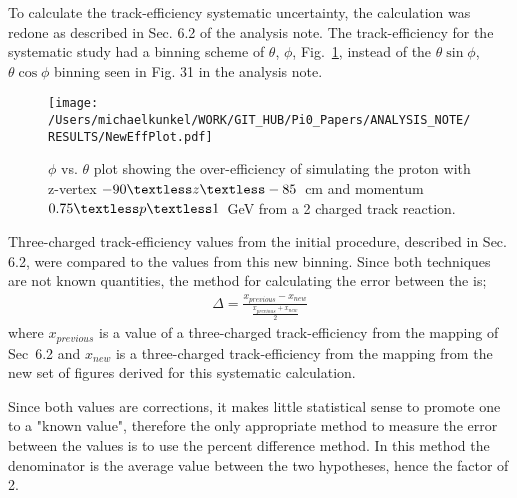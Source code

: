 \documentclass[10pt,a4paper]{report}
\author{Michael C. Kunkel}
\newlength{\figwidth}
\newlength{\hfigheight}
\begin{document}
	To calculate the track-efficiency systematic uncertainty, the calculation was redone as described in Sec. 6.2 of the analysis note. The track-efficiency for the systematic study had a binning scheme of $\theta$, $\phi$, Fig.~\ref{fig:toteff_protnew}, instead of the $\theta \sin\phi$, $\theta \cos\phi$ binning seen in Fig. 31 in the analysis note.
	
\begin{figure}[h!]\begin{center}
		\texttt{[image: /Users/michaelkunkel/WORK/GIT\_HUB/Pi0\_Papers/ANALYSIS\_NOTE/RESULTS/NewEffPlot.pdf]}
		\caption[$\phi$ vs. $\theta$ plot showing the over-efficiency of simulating the proton with z-vertex $-90\textless z\textless-85$~cm and momentum $0.75\textless p \textless 1$~GeV from a 2 charged track reaction]{\label{fig:toteff_protnew} $\phi$ vs. $\theta$ plot showing the over-efficiency of simulating the proton with z-vertex $-90\textless z\textless-85$~cm and momentum $0.75\textless p \textless 1$~GeV from a 2 charged track reaction.}
\end{center}\end{figure}
		
Three-charged track-efficiency values from the initial procedure, described in Sec. 6.2, were compared to the values from this new binning. Since both techniques are not known quantities, the method for calculating the error between the is;
\begin{align}
	\Delta = \frac{x_{previous} -x_{new} }{\frac{x_{previous} +x_{new}}{2}} \label{eq:eq1}
\end{align}	
where $x_{previous}$ is a value of a three-charged track-efficiency from the mapping of Sec~6.2 and $x_{new}$ is a three-charged track-efficiency from the mapping from the new set of figures derived for this systematic calculation.

Since both values are corrections, it makes little statistical sense to promote one to a "known value", therefore the only appropriate method to measure the error between the values is to use the percent difference method. In this method the denominator is the average value between the two hypotheses, hence the factor of 2.
\end{document}
